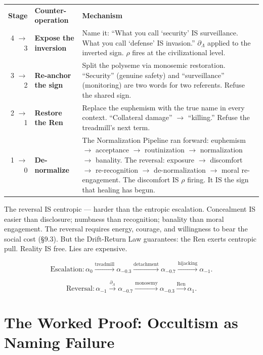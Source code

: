 \documentclass[11pt, oneside]{article}
\theoremstyle{definition}
\begin{document}
{\small
\noindent\begin{tabular}{@{} r @{\hspace{0.3em}} l @{\hspace{0.3em}} p{} @{}}
\textbf{Stage} & \textbf{Counter-operation} & \textbf{Mechanism} \\[0.2em]
4 $\to$ 3 & \textbf{Expose the inversion} & Name it: ``What you call `security' IS surveillance. What you call `defense' IS invasion.'' $\partial_\Lambda$ applied to the inverted sign. $\rho$ fires at the civilizational level. \\[0.15em]
3 $\to$ 2 & \textbf{Re-anchor the sign} & Split the polyseme via monosemic restoration. ``Security'' (genuine safety) and ``surveillance'' (monitoring) are two words for two referents. Refuse the shared sign. \\[0.15em]
2 $\to$ 1 & \textbf{Restore the Ren} & Replace the euphemism with the true name in every context. ``Collateral damage'' $\to$ ``killing.'' Refuse the treadmill's next term. \\[0.15em]
1 $\to$ 0 & \textbf{De-normalize} & The Normalization Pipeline ran forward: euphemism $\to$ acceptance $\to$ routinization $\to$ normalization $\to$ banality. The reversal: exposure $\to$ discomfort $\to$ re-recognition $\to$ de-normalization $\to$ moral re-engagement. The discomfort IS $\rho$ firing. It IS the sign that healing has begun. \\[0.15em]
\end{tabular}
}

The reversal IS centropic --- harder than the entropic escalation. Concealment IS easier than disclosure; numbness than recognition; banality than moral engagement. The reversal requires energy, courage, and willingness to bear the social cost (\S9.3). But the Drift-Return Law \cite{codex1} guarantees: the Ren exerts centropic pull. Reality IS free. Lies are expensive.

$$\boxed{\text{Escalation}: \alpha_0 \xrightarrow{\text{treadmill}} \alpha_{-0.3} \xrightarrow{\text{detachment}} \alpha_{-0.7} \xrightarrow{\text{hijacking}} \alpha_{-1}.}$$

$$\boxed{\text{Reversal}: \alpha_{-1} \xrightarrow{\partial_\Lambda} \alpha_{-0.7} \xrightarrow{\text{monosemy}} \alpha_{-0.3} \xrightarrow{\text{Ren}} \alpha_1.}$$

\section{The Worked Proof: Occultism as Naming Failure}
\end{document}
